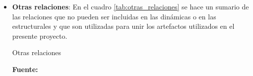 \begin{itemize}
\begin{table}
\begin{center}
    \end{center}
\end{table}

\item \textbf{Otras relaciones}: En el cuadro \ref{tab:otras_relaciones} se hace un sumario de las relaciones que no pueden ser incluidas en las dinámicas o en las estructurales y que son utilizadas para unir los artefactos utilizados en el presente proyecto.

\begin{table}
  \caption{Otras relaciones}
  \label{tab:otras_relaciones}

  \begin{center}
  
  \textbf{Fuente:} \cite{archimate2}
  

\end{center}
\end{table}
\end{itemize}
